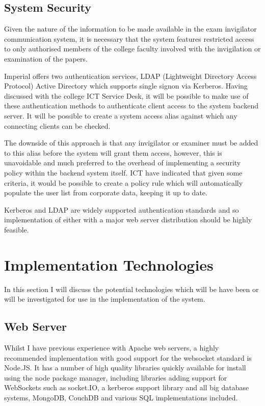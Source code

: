 \documentclass[a4paper, 12pt, notitlepage]{report}
\begin{document}
\subsection{System Security}

Given the nature of the information to be made available in the exam invigilator communication system, it is necessary that the system features restricted access to only authorised members of the college faculty involved with the invigilation or examination of the papers.

Imperial offers two authentication services, LDAP (Lightweight Directory Access Protocol) Active Directory which supports single signon via Kerberos.  Having discussed with the college ICT Service Desk, it will be possible to make use of these authentication methods to authenticate client access to the system backend server.  It will be possible to create a system access alias against which any connecting clients can be checked.

The downside of this approach is that any invigilator or examiner must be added to this alias before the system will grant them access, however, this is unavoidable and much preferred to the overhead of implementing a security policy within the backend system itself.  ICT have indicated that given some criteria, it would be possible to create a policy rule which will automatically populate the user list from corporate data, keeping it up to date.

Kerberos and LDAP are widely supported authentication standards and so implementation of either with a major web server distribution should be highly feasible.

\section{Implementation Technologies}

In this section I will discuss the potential technologies which will be have been or will be investigated for use in the implementation of the system.

\subsection{Web Server}

Whilst I have previous experience with Apache web servers, a highly recommended implementation with good support for the websocket standard is Node.JS.  It has a number of high quality libraries quickly available for install using the node package manager, including libraries adding support for WebSockets such as socket.IO, a kerberos support library and all big database systems, MongoDB, CouchDB and various SQL implementations included.
\end{document}
